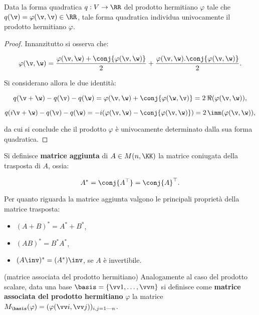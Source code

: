\begin{proposition}
	Data la forma quadratica $q : V \to \RR$  del prodotto hermitiano $\varphi$ tale che $q(\v) = \varphi(\v, \v) \in \RR$, tale
	forma quadratica individua univocamente il prodotto hermitiano $\varphi$.
\end{proposition}

\begin{proof}
	Innanzitutto si osserva che:
	
	\[ \varphi(\v, \w) = \frac{\varphi(\v, \w) + \conj{\varphi(\v, \w)}}{2} +  \frac{\varphi(\v, \w) . \conj{\varphi(\v, \w)}}{2}. \]
	
	\vskip 0.05in
	
	Si considerano allora le due identità:
	
	\[ q(\v + \w) - q(\v) - q(\w) =
	\varphi(\v, \w) + \conj{\varphi(\w, \v)} = 2 \, \Re(\varphi(\v, \w)), \]
	
	\[ q(i\v + \w) - q(\v) - q(\w) = -i(\varphi(\v, \w) - \conj{\varphi(\v, \w)}) = 2 \, \imm(\varphi(\v, \w)), \]
	
	\vskip 0.05in
	
	da cui si conclude che il prodotto $\varphi$ è univocamente
	determinato dalla sua forma quadratica.
\end{proof}

\begin{definition}
	Si definisce \textbf{matrice aggiunta} di $A \in M(n, \KK)$ la matrice coniugata della trasposta di $A$, ossia:
	
	\[ A^* = \conj{A^\top} = \conj{A}^\top. \]
\end{definition}

\begin{remark}
	Per quanto riguarda la matrice aggiunta valgono le principali proprietà della matrice trasposta:
	
	\begin{itemize}
		\item $(A + B)^* = A^* + B^*$,
		\item $(AB)^* = B^* A^*$,
		\item $(A\inv)^* = (A^*)\inv$, se $A$ è invertibile.
	\end{itemize}
\end{remark}


\begin{definition} (matrice associata del prodotto hermitiano) Analogamente
	al caso del prodotto scalare, data una base $\basis = \{\vv 1, \ldots, \vv n\}$ si definisce
	come \textbf{matrice associata del prodotto hermitiano} $\varphi$
	la matrice $M_\basis(\varphi) = (\varphi(\vv i, \vv j))_{i,j = 1 \textrm{---} n}$.
\end{definition}

